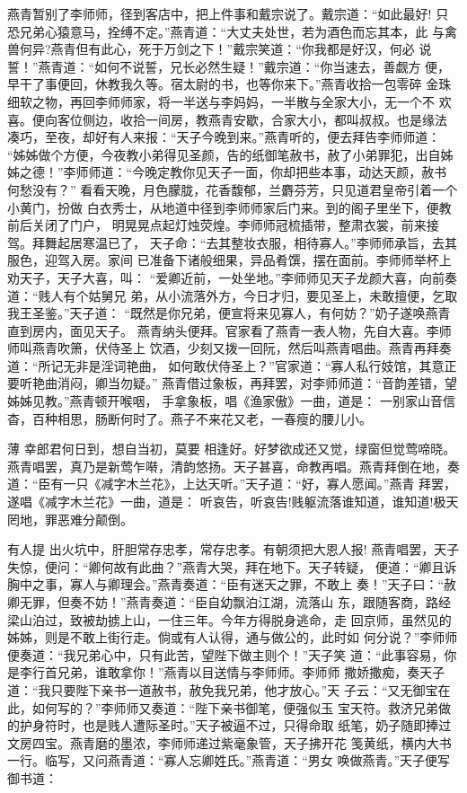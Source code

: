 燕青暂别了李师师，径到客店中，把上件事和戴宗说了。戴宗道：“如此最好!
只恐兄弟心猿意马，拴缚不定。”燕青道：“大丈夫处世，若为酒色而忘其本，此
与禽兽何异?燕青但有此心，死于万剑之下！”戴宗笑道：“你我都是好汉，何必
说誓！”燕青道：“如何不说誓，兄长必然生疑！”戴宗道：“你当速去，善觑方
便，早干了事便回，休教我久等。宿太尉的书，也等你来下。”燕青收拾一包零碎
金珠细软之物，再回李师师家，将一半送与李妈妈，一半散与全家大小，无一个不
欢喜。便向客位侧边，收拾一间房，教燕青安歇，合家大小，都叫叔叔。也是缘法
凑巧，至夜，却好有人来报：“天子今晚到来。”燕青听的，便去拜告李师师道：
“姊姊做个方便，今夜教小弟得见圣颜，告的纸御笔赦书，赦了小弟罪犯，出自姊
姊之德！”李师师道：“今晚定教你见天子一面，你却把些本事，动达天颜，赦书
何愁没有？”
看看天晚，月色朦胧，花香馥郁，兰麝芬芳，只见道君皇帝引着一个小黄门，扮做
白衣秀士，从地道中径到李师师家后门来。到的阁子里坐下，便教前后关闭了门户，
明晃晃点起灯烛荧煌。李师师冠梳插带，整肃衣裳，前来接驾。拜舞起居寒温已了，
天子命：“去其整妆衣服，相待寡人。”李师师承旨，去其服色，迎驾入房。家间
已准备下诸般细果，异品肴馔，摆在面前。李师师举杯上劝天子，天子大喜，叫：
“爱卿近前，一处坐地。”李师师见天子龙颜大喜，向前奏道：“贱人有个姑舅兄
弟，从小流落外方，今日才归，要见圣上，未敢擅便，乞取我王圣鉴。”天子道：
“既然是你兄弟，便宣将来见寡人，有何妨？”奶子遂唤燕青直到房内，面见天子。
燕青纳头便拜。官家看了燕青一表人物，先自大喜。李师师叫燕青吹箫，伏侍圣上
饮酒，少刻又拨一回阮，然后叫燕青唱曲。燕青再拜奏道：“所记无非是淫词艳曲，
如何敢伏侍圣上？”官家道：“寡人私行妓馆，其意正要听艳曲消闷，卿当勿疑。”
燕青借过象板，再拜罢，对李师师道：“音韵差错，望姊姊见教。”燕青顿开喉咽，
手拿象板，唱《渔家傲》一曲，道是：
一别家山音信杳，百种相思，肠断何时了。燕子不来花又老，一春瘦的腰儿小。

薄
幸郎君何日到，想自当初，莫要
相逢好。好梦欲成还又觉，绿窗但觉莺啼晓。
燕青唱罢，真乃是新莺乍啭，清韵悠扬。天子甚喜，命教再唱。燕青拜倒在地，奏
道：“臣有一只《减字木兰花》，上达天听。”天子道：“好，寡人愿闻。”燕青
拜罢，遂唱《减字木兰花》一曲，道是：
听哀告，听哀告!贱躯流落谁知道，谁知道!极天罔地，罪恶难分颠倒。

有人提
出火坑中，肝胆常存忠孝，常存忠孝。有朝须把大恩人报!
燕青唱罢，天子失惊，便问：“卿何故有此曲？”燕青大哭，拜在地下。天子转疑，
便道：“卿且诉胸中之事，寡人与卿理会。”燕青奏道：“臣有迷天之罪，不敢上
奏！”天子曰：“赦卿无罪，但奏不妨！”燕青奏道：“臣自幼飘泊江湖，流落山
东，跟随客商，路经梁山泊过，致被劫掳上山，一住三年。今年方得脱身逃命，走
回京师，虽然见的姊姊，则是不敢上街行走。倘或有人认得，通与做公的，此时如
何分说？”李师师便奏道：“我兄弟心中，只有此苦，望陛下做主则个！”天子笑
道：“此事容易，你是李行首兄弟，谁敢拿你！”燕青以目送情与李师师。李师师
撒娇撒痴，奏天子道：“我只要陛下亲书一道赦书，赦免我兄弟，他才放心。”天
子云：“又无御宝在此，如何写的？”李师师又奏道：“陛下亲书御笔，便强似玉
宝天符。救济兄弟做的护身符时，也是贱人遭际圣时。”天子被逼不过，只得命取
纸笔，奶子随即捧过文房四宝。燕青磨的墨浓，李师师递过紫毫象管，天子拂开花
笺黄纸，横内大书一行。临写，又问燕青道：“寡人忘卿姓氏。”燕青道：“男女
唤做燕青。”天子便写御书道：

